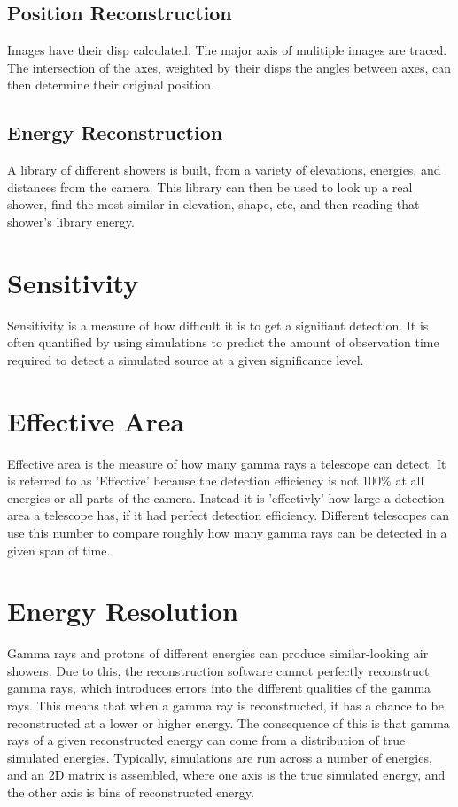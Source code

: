 \subsection{Position Reconstruction}\label{subsec:posrecon}
Images have their disp calculated.
The major axis of mulitiple images are traced.
The intersection of the axes, weighted by their disps the angles between axes, can then determine their original position.

\subsection{Energy Reconstruction}\label{subsec:enrecon}
A library of different showers is built, from a variety of elevations, energies, and distances from the camera.
This library can then be used to look up a real shower, find the most similar in elevation, shape, etc, and then reading that shower's library energy.

\section{Sensitivity}
Sensitivity is a measure of how difficult it is to get a signifiant detection.
It is often quantified by using simulations to predict the amount of observation time required to detect a simulated source at a given significance level.

\section{Effective Area}
Effective area is the measure of how many gamma rays a telescope can detect.
It is referred to as 'Effective' because the detection efficiency is not 100\% at all energies or all parts of the camera.
Instead it is 'effectivly' how large a detection area a telescope has, if it had perfect detection efficiency.
Different telescopes can use this number to compare roughly how many gamma rays can be detected in a given span of time.

\section{Energy Resolution}
Gamma rays and protons of different energies can produce similar-looking air showers.
Due to this, the reconstruction software cannot perfectly reconstruct gamma rays, which introduces errors into the different qualities of the gamma rays.
This means that when a gamma ray is reconstructed, it has a chance to be reconstructed at a lower or higher energy.
The consequence of this is that gamma rays of a given reconstructed energy can come from a distribution of true simulated energies.
Typically, simulations are run across a number of energies, and an 2D matrix is assembled, where one axis is the true simulated energy, and the other axis is bins of reconstructed energy.

